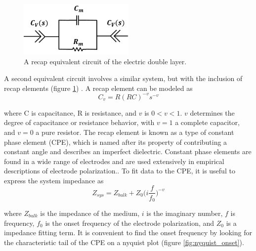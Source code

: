 \begin{figure}[h]
    \centering
    \includegraphics[width=0.5\textwidth]{images/edl_recap_equiv.png}
    \caption{A recap equivalent circuit of the electric double layer.}
    \label{fig:edl_recap_equiv}
\end{figure}


\par A second equivalent circuit involves a similar system, but with the inclusion of recap elements (figure \ref{fig:edl_recap_equiv}) \cite{feldman_fractal-polarization_1998-1}. A recap element can be modeled as 
\begin{equation}
    C_v = R(RC)^{-v}s^{-v}
\end{equation}

\noindent where C is capacitance, R is resistance, and $v$ is $0<v<1$. $v$ determines the degree of capacitance or resistance behavior, with $v=1$ a complete capacitor, and $v=0$ a pure resistor. The recap element is known as a type of constant phase element (CPE), which is named after its property of contributing a constant angle and describes an imperfect dielectric. Constant phase elements are found in a wide range of electrodes and are used extensively in empirical descriptions of electrode polarization.\cite{ishai_electrode_2013}. To fit data to the CPE, it is useful to express the system impedance as
\begin{equation}
    Z_{sys} = Z_{bulk} + Z_0\bigg(i\frac{f}{f_0}\bigg)^{-v}
\end{equation}

\noindent where $Z_{bulk}$ is the impedance of the medium, $i$ is the imaginary number, $f$ is frequency, $f_0$ is the onset frequency of the electrode polarization, and $Z_0$ is a impedance fitting term. It is convenient to find the onset frequency by looking for the characteristic tail of the CPE on a nyquist plot (figure \ref{fig:nyquist_onset}).

